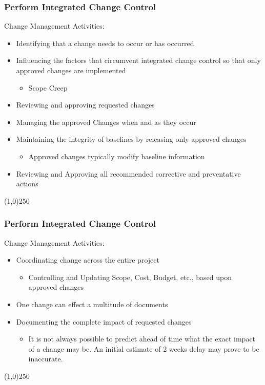 \begin{frame}
\frametitle{Perform Integrated Change Control}
Change Management Activities:
\begin{itemize}
	\item Identifying that a change needs to occur or has occurred
	\item Influencing the factors that circumvent integrated change control so that only approved changes are implemented
\begin{itemize}
	\item Scope Creep
\end{itemize}
	\item Reviewing and approving requested changes
	\item Managing the approved Changes when and as they occur
	\item Maintaining the integrity of baselines by releasing only approved changes
\begin{itemize}
	\item Approved changes typically modify baseline information
\end{itemize}
	\item Reviewing and Approving all recommended corrective and preventative actions
\end{itemize}
 
\end{frame}\begin{center}\line(1,0){250}\end{center}
%
%

\begin{frame}
\frametitle{Perform Integrated Change Control}
Change Management Activities:
\begin{itemize}
	\item Coordinating change across the entire project
		\begin{itemize}
			\item Controlling and Updating Scope, Cost, Budget, etc., based upon approved changes
		\end{itemize}
	\item One change can effect a multitude of documents
	\item Documenting the complete impact of requested changes
		\begin{itemize}
			\item It is not always possible to predict ahead of time what the exact impact of a change may be.  An initial estimate of 2 weeks delay may prove to be inaccurate.
		\end{itemize}
\end{itemize}
\end{frame}\begin{center}\line(1,0){250}\end{center}
%
%

